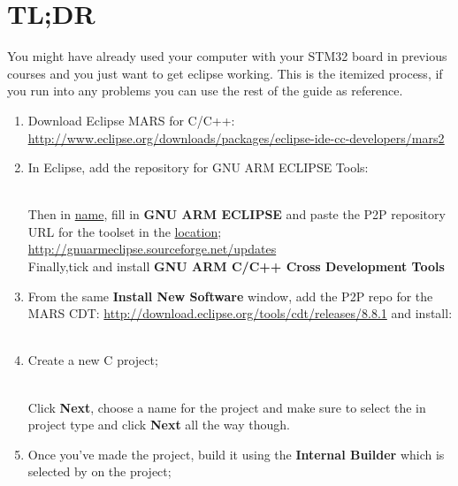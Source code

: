 \section{TL;DR}
\label{tldr}
You might have already used your computer with your STM32 board in previous courses and you just want to get eclipse working. This is the itemized process, if you run into any problems you can use the rest of the guide as reference.
\par
\begin{enumerate}
\raggedright
\item Download Eclipse MARS for C/C++:\\
\centering \href{http://www.eclipse.org/downloads/packages/eclipse-ide-cc-developers/mars2}{\color{Blue} \underline{http://www.eclipse.org/downloads/packages/eclipse-ide-cc-developers/mars2}}
\\
\raggedright
\item In Eclipse, add the repository for GNU ARM ECLIPSE Tools:\\
\centering {}
\\
\raggedright
Then in \underline{name}, fill in \textbf{GNU ARM ECLIPSE} and paste the P2P repository URL for the toolset in the \underline{location}; \url{http://gnuarmeclipse.sourceforge.net/updates} 
\\
Finally,tick and install \textbf{GNU ARM C/C++ Cross Development Tools}
\raggedright
\item From the same \textbf{Install New Software} window, add the P2P repo for the MARS CDT: \url{http://download.eclipse.org/tools/cdt/releases/8.8.1} and install:
\\
\centering {}
\\
\raggedright
\item Create a new C project;\\
\centering {}\\
\raggedright 
Click \textbf{Next}, choose a name for the project and make sure to select the  in project type and click \textbf{Next} all the way though.
\raggedright
\item Once you've made the project, build it using the \textbf{Internal Builder} which is selected by  on the project;\\
\centering {}

\end{enumerate}
